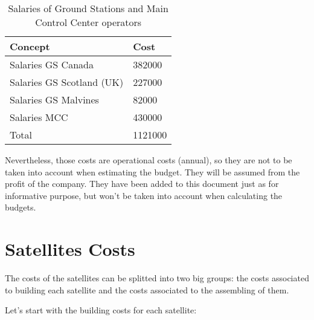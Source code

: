 \begin{table}[h]
\begin{center}
\begin{tabular}{ | l | l | }
\toprule
\hline
	\rowcolor[gray]{0.75}
	Concept & Cost \\ \hline
	Salaries GS Canada & 382000 \\ \hline
	Salaries GS Scotland (UK) & 227000 \\ \hline
	Salaries GS Malvines & 82000 \\ \hline
	Salaries MCC & 430000 \\ \hline
	\rowcolor[gray]{0.65}
	Total & 1121000 \\ \hline
	\bottomrule
\end{tabular}
\caption{Salaries of Ground Stations and Main Control Center operators}
\end{center}
\end{table}

Nevertheless, those costs are operational costs (annual), so they are not to be taken into account when estimating the budget. They will be assumed from the profit of the company. They have been added to this document just as for informative purpose, but won't be taken into account when calculating the budgets. 

\section{Satellites Costs}
The costs of the satellites can be splitted into two big groups: the costs associated to building each satellite and the costs associated to the assembling of them.

Let's start with the building costs for each satellite:

